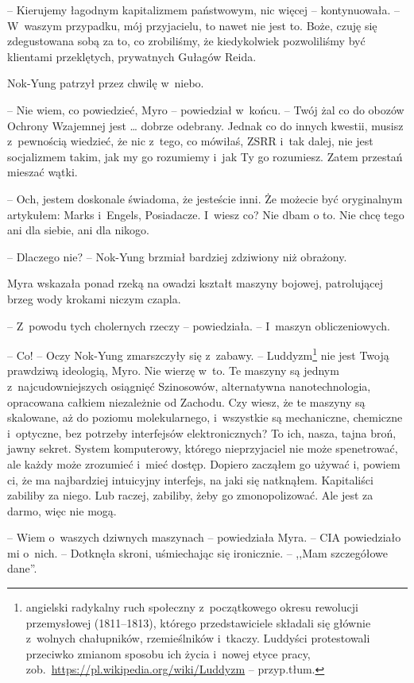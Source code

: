\documentclass[oneside,polish,11pt,sfheadings]{mwbk}
\begin{document}
-- Kierujemy łagodnym kapitalizmem państwowym, nic więcej -- kontynuowała.
-- W~waszym przypadku, mój przyjacielu, to nawet nie jest to. Boże, czuję
się zdegustowana sobą za to, co zrobiliśmy, że kiedykolwiek pozwoliliśmy
być klientami przeklętych, prywatnych Gułagów Reida.

Nok-Yung patrzył przez chwilę w~niebo. 

-- Nie wiem, co powiedzieć, Myro -- powiedział w~końcu. -- Twój żal co do obozów Ochrony Wzajemnej jest \ldots
dobrze odebrany. Jednak co do innych kwestii, musisz z~pewnością
wiedzieć, że nic z~tego, co mówiłaś, ZSRR i~tak dalej, nie jest
socjalizmem takim, jak my go rozumiemy i~jak Ty go rozumiesz. Zatem
przestań mieszać wątki.

-- Och, jestem doskonale świadoma, że jesteście inni. Że możecie być
oryginalnym artykułem: Marks i~Engels, Posiadacze. I~wiesz co? Nie dbam
o to. Nie chcę tego ani dla siebie, ani dla nikogo.

-- Dlaczego nie? -- Nok-Yung brzmiał bardziej zdziwiony niż obrażony.

Myra wskazała ponad rzeką na owadzi kształt maszyny bojowej,
patrolującej brzeg wody krokami niczym czapla.

-- Z~powodu tych cholernych rzeczy -- powiedziała. -- I~maszyn
obliczeniowych.

-- Co! -- Oczy Nok-Yung zmarszczyły się z~zabawy. -- Luddyzm\footnote{angielski
radykalny ruch społeczny z~początkowego okresu rewolucji przemysłowej
(1811--1813), którego przedstawiciele składali się głównie z~wolnych
chałupników, rzemieślników i~tkaczy. Luddyści protestowali przeciwko
zmianom sposobu ich życia i~nowej etyce pracy,
zob.~\url{https://pl.wikipedia.org/wiki/Luddyzm} -- przyp.tłum.} nie jest Twoją prawdziwą ideologią, Myro. Nie wierzę w~to.
Te maszyny są jednym z~najcudowniejszych osiągnięć Szinosowów,
alternatywna nanotechnologia, opracowana całkiem niezależnie od Zachodu.
Czy wiesz, że te maszyny są skalowane, aż do poziomu molekularnego, i~wszystkie są mechaniczne, chemiczne i~optyczne, bez potrzeby interfejsów
elektronicznych? To ich, nasza, tajna broń, jawny sekret. System
komputerowy, którego nieprzyjaciel nie może spenetrować, ale każdy może
zrozumieć i~mieć dostęp. Dopiero zacząłem go używać i, powiem ci, że ma
najbardziej intuicyjny interfejs, na jaki się natknąłem. Kapitaliści
zabiliby za niego. Lub raczej, zabiliby, żeby go zmonopolizować. Ale
jest za darmo, więc nie mogą.

-- Wiem o~waszych dziwnych maszynach -- powiedziała Myra. -- CIA
powiedziało mi o~nich. -- Dotknęła skroni, uśmiechając się ironicznie. -- ,,Mam szczegółowe dane''.
\end{document}

